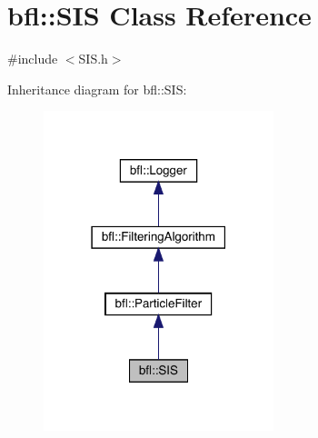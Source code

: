 \hypertarget{classbfl_1_1SIS}{}\section{bfl\+:\+:S\+IS Class Reference}
\label{classbfl_1_1SIS}


{\ttfamily \#include $<$S\+I\+S.\+h$>$}



Inheritance diagram for bfl\+:\+:S\+IS\+:
\nopagebreak
\begin{figure}[H]
\begin{center}
\leavevmode
\includegraphics[width=190pt]{classbfl_1_1SIS__inherit__graph}
\end{center}
\end{figure}
